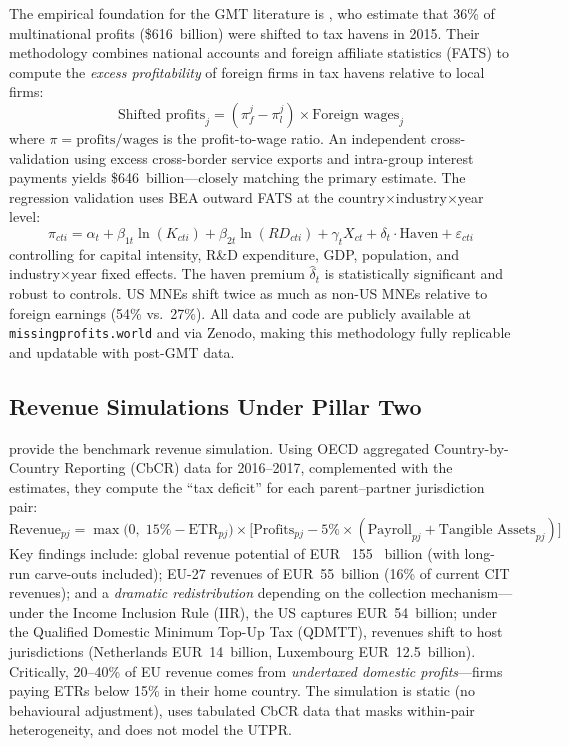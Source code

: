\documentclass[11pt,a4paper]{article}
\begin{document}
The empirical foundation for the GMT literature is \citet{torslov2022}, who estimate that 36\% of multinational profits (\$616~billion) were shifted to tax havens in 2015. Their methodology combines national accounts and foreign affiliate statistics (FATS) to compute the \emph{excess profitability} of foreign firms in tax havens relative to local firms:
\begin{equation}
\text{Shifted profits}_j = (\pi_f^j - \pi_l^j) \times \text{Foreign wages}_j
\end{equation}
where $\pi = \text{profits}/\text{wages}$ is the profit-to-wage ratio. An independent cross-validation using excess cross-border service exports and intra-group interest payments yields \$646~billion---closely matching the primary estimate. The regression validation uses BEA outward FATS at the country$\times$industry$\times$year level:
\begin{equation}
\pi_{cti} = \alpha_t + \beta_{1t} \ln(K_{cti}) + \beta_{2t} \ln(RD_{cti}) + \gamma_t X_{ct} + \delta_t \cdot \text{Haven} + \varepsilon_{cti}
\end{equation}
controlling for capital intensity, R\&D expenditure, GDP, population, and industry$\times$year fixed effects. The haven premium $\hat{\delta}_t$ is statistically significant and robust to controls. US MNEs shift twice as much as non-US MNEs relative to foreign earnings (54\% vs.\ 27\%). All data and code are publicly available at \texttt{missingprofits.world} and via Zenodo, making this methodology fully replicable and updatable with post-GMT data.

\subsection{Revenue Simulations Under Pillar Two}
\label{subsec:barake}

\citet{barake2022} provide the benchmark revenue simulation. Using OECD aggregated Country-by-Country Reporting (CbCR) data for 2016--2017, complemented with the \citet{torslov2022} estimates, they compute the ``tax deficit'' for each parent--partner jurisdiction pair:
\begin{equation}
\text{Revenue}_{pj} = \max\bigl(0,\; 15\% - \text{ETR}_{pj}\bigr) \times \bigl[\text{Profits}_{pj} - 5\% \times (\text{Payroll}_{pj} + \text{Tangible Assets}_{pj})\bigr]
\label{eq:barake}
\end{equation}
Key findings include: global revenue potential of EUR ~155~ billion (with long-run carve-outs included); EU-27 revenues of EUR~55~billion (16\% of current CIT revenues); and a \emph{dramatic redistribution} depending on the collection mechanism---under the Income Inclusion Rule (IIR), the US captures EUR~54~billion; under the Qualified Domestic Minimum Top-Up Tax (QDMTT), revenues shift to host jurisdictions (Netherlands EUR~14~billion, Luxembourg EUR~12.5~billion). Critically, 20--40\% of EU revenue comes from \emph{undertaxed domestic profits}---firms paying ETRs below 15\% in their home country. The simulation is static (no behavioural adjustment), uses tabulated CbCR data that masks within-pair heterogeneity, and does not model the UTPR.
\end{document}
